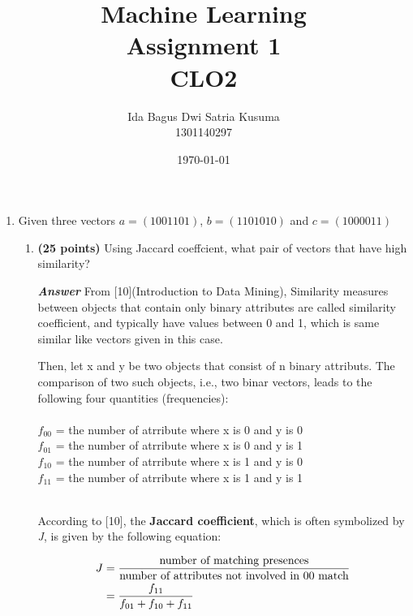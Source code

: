 \documentclass[12pt]{article}%
\begin{document}
\title{Machine Learning \protect\\ Assignment 1 \protect\\ CLO2} 
\author{Ida Bagus Dwi Satria Kusuma \protect\\ 1301140297}
\date{\today}
\maketitle

\begin{enumerate}
	\item Given three vectors $a = (1 0 0 1 1 0 1)$, $b = (1 1 0 1 0 1 0)$ and $c = (1 0 0 0 0 1 1 )$
	\begin{enumerate}	
		\item \textbf{(25 points)} Using Jaccard coeffcient, what pair of vectors that have high similarity?
		\par \textbf{\textit{Answer}} From [10](Introduction to Data Mining), Similarity measures between objects that contain only binary attributes are called similarity coefficient, and typically have values between 0 and 1, which is same similar like vectors given in this case. 
		\par Then, let x and y be two objects that consist of n binary attributs. The comparison of two such objects, i.e., two binar vectors, leads to the following four quantities (frequencies):\\ \\
		$f_{00}$ = the number of atrribute where x is 0 and y is 0 \\
		$f_{01}$ = the number of atrribute where x is 0 and y is 1 \\
		$f_{10}$ = the number of atrribute where x is 1 and y is 0 \\
		$f_{11}$ = the number of atrribute where x is 1 and y is 1 \\ \\

		\par According to [10], the \textbf{Jaccard coefficient}, which is often symbolized by \textit{J}, is given by the following equation:

		
		\begin{equation}
		\begin{split}
			J & = \frac{\textup{number of matching presences}}{\textup{number of attributes not involved in 00 match}}\\ 
			& = \frac{f_{11}}{f_{01}+f_{10}+f_{11}}
		\end{split}
		\end{equation}
		


\end{enumerate}
\end{enumerate}
\end{document}
